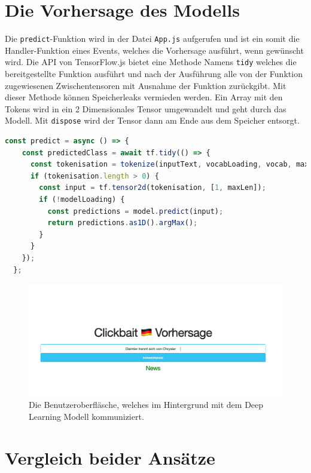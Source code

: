 \section{Die Vorhersage des Modells}
Die \texttt{predict}-Funktion wird in der Datei \texttt{App.js} aufgerufen und ist ein somit die Handler-Funktion eines Events, welches die Vorhersage ausführt, wenn gewünscht wird. Die API von TensorFlow.js bietet eine Methode Namens \texttt{tidy} welches die bereitgestellte Funktion ausführt und nach der Ausführung alle von der Funktion zugewiesenen Zwischentensoren mit Ausnahme der Funktion zurückgibt. Mit dieser Methode können Speicherleaks vermieden werden. Ein Array mit den Tokens wird in ein 2 Dimensionales Tensor umgewandelt und geht durch das Modell. Mit \texttt{dispose} wird der Tensor dann am Ende aus dem Speicher entsorgt.

\begin{lstlisting}[language=JavaScript, caption=Auszug aus der predict Funktion, label={prediJS}]
const predict = async () => {
    const predictedClass = await tf.tidy(() => {
      const tokenisation = tokenize(inputText, vocabLoading, vocab, maxLen);
      if (tokenisation.length > 0) {
        const input = tf.tensor2d(tokenisation, [1, maxLen]);
        if (!modelLoading) {
          const predictions = model.predict(input);
          return predictions.as1D().argMax();
        }
      }
    });
  };
\end{lstlisting}


\begin{figure}[H]
    \centering
    \includegraphics[width=14cm]{kapitel5/frontend.png}
    \caption[Das Frontend]{Die Benutzeroberfläsche, welches im Hintergrund mit dem Deep Learning Modell kommuniziert.}
    \label{Frontend}
\end{figure}

\section{Vergleich beider Ansätze}


